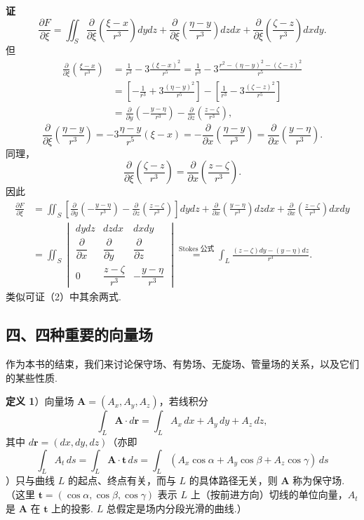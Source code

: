 \documentclass[UTF8,12pt,a4paper,fontset=fandol]{ctexart}
\providecommand{\xlongequal}[1]{\overset{#1}{=}}
\begin{document}
\noindent\textbf{证}\quad
\[
\frac{\partial F}{\partial\xi}
=\iint_S\frac{\partial}{\partial\xi}\left(\frac{\xi-x}{r^3}\right)dydz
+\frac{\partial}{\partial\xi}\left(\frac{\eta-y}{r^3}\right)dzdx
+\frac{\partial}{\partial\xi}\left(\frac{\zeta-z}{r^3}\right)dxdy. \tag{3}
\]
但
\[
\begin{aligned}
\frac{\partial}{\partial\xi}\left(\frac{\xi-x}{r^3}\right)
&=\frac1{r^3}-3\frac{(\xi-x)^2}{r^5}
=\frac1{r^3}-3\frac{r^2-(\eta-y)^2-(\zeta-z)^2}{r^5}\\
&=\left[-\frac1{r^3}+3\frac{(\eta-y)^2}{r^5}\right]
-\left[\frac1{r^3}-3\frac{(\zeta-z)^2}{r^5}\right]\\
&=\frac\partial{\partial y}\left(-\frac{y-\eta}{r^3}\right)
-\frac\partial{\partial z}\left(\frac{z-\zeta}{r^3}\right),
\end{aligned}
\]
\[
\frac{\partial}{\partial\xi}\left(\frac{\eta-y}{r^3}\right)
=-3\frac{\eta-y}{r^5}(\xi-x)
=-\frac\partial{\partial x}\left(\frac{\eta-y}{r^3}\right)
=\frac\partial{\partial x}\left(\frac{y-\eta}{r^3}\right).
\]
同理，
\[
\frac{\partial}{\partial\xi}\left(\frac{\zeta-z}{r^3}\right)=\frac\partial{\partial x}\left(\frac{z-\zeta}{r^3}\right).
\]
因此
\[
\begin{aligned}
\frac{\partial F}{\partial\xi}
&=\iint_S\left[\frac\partial{\partial y}\left(-\frac{y-\eta}{r^3}\right)-\frac\partial{\partial z}\left(\frac{z-\zeta}{r^3}\right)\right]dydz
+\frac\partial{\partial x}\left(\frac{y-\eta}{r^3}\right)dzdx
+\frac\partial{\partial x}\left(\frac{z-\zeta}{r^3}\right)dxdy\\
&=\iint_S
\begin{vmatrix}
dydz & dzdx & dxdy\\
\dfrac{\partial}{\partial x} & \dfrac{\partial}{\partial y} & \dfrac{\partial}{\partial z}\\
0 & \dfrac{z-\zeta}{r^3} & -\dfrac{y-\eta}{r^3}
\end{vmatrix}
\xlongequal{\text{Stokes 公式}}
\int_L\frac{(z-\zeta)dy-(y-\eta)dz}{r^3}.
\end{aligned}
\]
类似可证（2）中其余两式.

\subsection*{四、四种重要的向量场}

作为本书的结束，我们来讨论保守场、有势场、无旋场、管量场的关系，以及它们的某些性质.

\noindent\textbf{定义 1}）向量场 $\mathbf A=(A_x,A_y,A_z)$，若线积分
\[
\int_L\mathbf A\cdot d\mathbf r=\int_LA_x\,dx+A_y\,dy+A_z\,dz,
\]
其中 $d\mathbf r=(dx,dy,dz)$（亦即
\[
\int_LA_t\,ds=\int_L\mathbf A\cdot\mathbf t\,ds
=\int_L(A_x\cos\alpha+A_y\cos\beta+A_z\cos\gamma)\,ds
\]
）只与曲线 $L$ 的起点、终点有关，而与 $L$ 的具体路径无关，则 $\mathbf A$ 称为保守场.（这里 $\mathbf t=(\cos\alpha,\cos\beta,\cos\gamma)$ 表示 $L$ 上（按前进方向）切线的单位向量，$A_t$ 是 $\mathbf A$ 在 $\mathbf t$ 上的投影. $L$ 总假定是场内分段光滑的曲线.）
\end{document}
